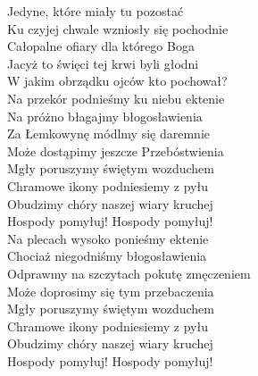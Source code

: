 \begin{minipage}[t]{\dimexpr.4\textwidth-.4\columnsep}
{    Jedyne, które miały tu pozostać\\
    \hfill\break
    Ku czyjej chwale wzniosły się pochodnie\\
    Całopalne ofiary dla którego Boga\\
    Jacyż to święci tej krwi byli głodni\\
    W jakim obrządku ojców kto pochował?\\
    \hfill\break
    \vin Na przekór podnieśmy ku niebu ektenie\\
    \vin Na próżno błagajmy błogosławienia\\
    \vin Za Łemkowynę módlmy się daremnie\\
    \vin Może dostąpimy jeszcze Przebóstwienia\\
    \hfill\break
    \vin Mgły poruszymy świętym wozduchem\\
    \vin Chramowe ikony podniesiemy z pyłu\\
    \vin Obudzimy chóry naszej wiary kruchej\\
    \vin Hospody pomyłuj! Hospody pomyłuj!\\
    \hfill\break
    \vin Na plecach wysoko ponieśmy ektenie\\
    \vin Chociaż niegodniśmy błogosławienia\\
    \vin Odprawmy na szczytach pokutę zmęczeniem\\
    \vin Może doprosimy się tym przebaczenia\\
    \hfill\break
    \vin Mgły poruszymy świętym wozduchem\\
    \vin Chramowe ikony podniesiemy z pyłu\\
    \vin Obudzimy chóry naszej wiary kruchej\\
    \vin Hospody pomyłuj! Hospody pomyłuj!\\
    }
\end{minipage}
\hfill
\begin{minipage}[t]{\dimexpr.05\textwidth-.05\columnsep}
    \ifchorded %
    \footnotesize{
    \hfill\break
    \hfill\break
    }
    \else
    \fi
\end{minipage}